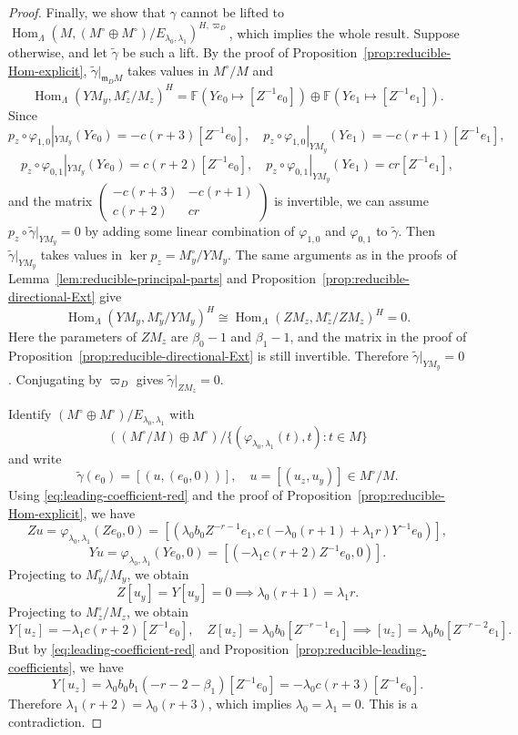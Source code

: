 \documentclass[11pt,a4paper]{article} %
\def\FF{\mathbb{F}}
\def\Hom{\operatorname{Hom}}
\begin{document}
\begin{proof}
    Finally, we show that $\gamma$ cannot be lifted to $\Hom_\Lambda\left(M,(M^\circ\oplus M^\circ)/E_{\lambda_0,\lambda_1}\right)^{H,\varpi_D}$, which implies the whole result. Suppose otherwise, and let $\widetilde{\gamma}$ be such a lift. By the proof of Proposition~\ref{prop:reducible-Hom-explicit}, $\widetilde{\gamma}|_{\mathfrak m_D M}$ takes values in $M^\circ/M$ and 
    \[
    \Hom_\Lambda(YM_y,M_z^\circ/M_z)^H=\FF\left(Ye_0\mapsto[Z^{-1}e_0]\right)\oplus\FF\left(Ye_1\mapsto[Z^{-1}e_1]\right).
    \]
    Since
    \[
    p_z\circ\varphi_{1,0}|_{YM_y}(Ye_0)=-c(r+3)[Z^{-1}e_0],\quad p_z\circ\varphi_{1,0}|_{YM_y}(Ye_1)=-c(r+1)[Z^{-1}e_1],
    \]
    \[
    p_z\circ\varphi_{0,1}|_{YM_y}(Ye_0)=c(r+2)[Z^{-1}e_0],\quad p_z\circ\varphi_{0,1}|_{YM_y}(Ye_1)=cr[Z^{-1}e_1],
    \]
    and the matrix $\begin{pmatrix}
    -c(r+3) & -c(r+1)\\
    c(r+2) & cr
    \end{pmatrix}$ is invertible, we can assume $p_z\circ\widetilde{\gamma}|_{YM_y}=0$ by adding some linear combination of $\varphi_{1,0}$ and $\varphi_{0,1}$ to $\widetilde{\gamma}$. Then $\widetilde{\gamma}|_{YM_y}$ takes values in $\ker p_z=M_y^\circ/YM_y$. The same arguments as in the proofs of Lemma~\ref{lem:reducible-principal-parts} and Proposition~\ref{prop:reducible-directional-Ext} give
    \[
    \Hom_\Lambda(YM_y,M_y^\circ/YM_y)^H\cong\Hom_\Lambda(ZM_z,M_z^\circ/ZM_z)^H=0.
    \]
    Here the parameters of $ZM_z$ are $\beta_0-1$ and $\beta_1-1$, and the matrix in the proof of Proposition~\ref{prop:reducible-directional-Ext} is still invertible. Therefore $\widetilde{\gamma}|_{YM_y}=0$. Conjugating by $\varpi_D$ gives $\widetilde{\gamma}|_{ZM_z}=0$.

    Identify $(M^\circ\oplus M^\circ)/E_{\lambda_0,\lambda_1}$ with 
    \[
    \left((M^\circ/M)\oplus M^\circ\right)/\{\left(\varphi_{\lambda_0,\lambda_1}(t),t\right):t\in M\}
    \]
    and write
    \[
    \widetilde{\gamma}(e_0)=[\left(u,(e_0,0)\right)],\quad u=[(u_z,u_y)]\in M^\circ/M.
    \]
    Using \eqref{eq:leading-coefficient-red} and the proof of Proposition~\ref{prop:reducible-Hom-explicit}, we have
    \[
    Zu=\varphi_{\lambda_0,\lambda_1}(Ze_0,0)=\left[\left(\lambda_0b_0Z^{-r-1}e_1,c\left(-\lambda_0(r+1)+\lambda_1r\right)Y^{-1}e_0\right)\right],
    \]
    \[
    Yu=\varphi_{\lambda_0,\lambda_1}(Ye_0,0)=\left[\left(-\lambda_1c(r+2)Z^{-1}e_0,0\right)\right].
    \]
    Projecting to $M_y^\circ/M_y$, we obtain
    \[
    Z[u_y]=Y[u_y]=0\implies\lambda_0(r+1)=\lambda_1r.
    \]
    Projecting to $M_z^\circ/M_z$, we obtain
    \[
    Y[u_z]=-\lambda_1c(r+2)[Z^{-1}e_0],\quad Z[u_z]=\lambda_0b_0[Z^{-r-1}e_1]\implies[u_z]=\lambda_0b_0[Z^{-r-2}e_1].
    \]
    But by \eqref{eq:leading-coefficient-red} and Proposition~\ref{prop:reducible-leading-coefficients}, we have
    \[
    Y[u_z]=\lambda_0b_0b_1(-r-2-\beta_1)[Z^{-1}e_0]=-\lambda_0c(r+3)[Z^{-1}e_0].
    \]
    Therefore $\lambda_1(r+2)=\lambda_0(r+3)$, which implies $\lambda_0=\lambda_1=0$. This is a contradiction.
\end{proof}
\end{document}
